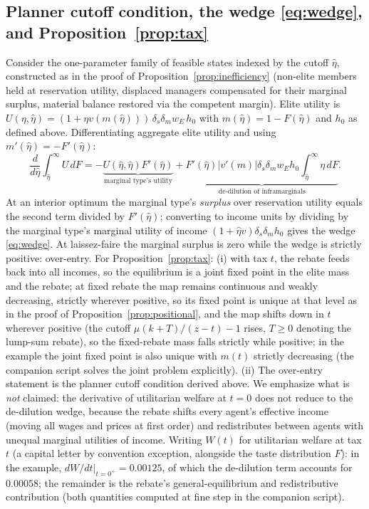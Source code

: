 \documentclass[12pt,letterpaper]{article}
\theoremstyle{definition}
\begin{document}
\subsection{Planner cutoff condition, the wedge \eqref{eq:wedge}, and Proposition~\ref{prop:tax}} Consider the one-parameter family of feasible states indexed by the cutoff $\hat\eta$, constructed as in the proof of Proposition~\ref{prop:inefficiency} (non-elite members held at reservation utility, displaced managers compensated for their marginal surplus, material balance restored via the competent margin).
Elite utility is $U(\eta,\hat\eta) = (1+\eta v(m(\hat\eta)))\,\delta_s\delta_m w_E\, h_0$ with $m(\hat\eta) = 1-F(\hat\eta)$ and $h_0$ as defined above.
Differentiating aggregate elite utility and using $m'(\hat\eta)=-F'(\hat\eta)$: \[ \frac{d}{d\hat\eta}\int_{\hat\eta}^{\infty}\!
U\, dF = -\underbrace{U(\hat\eta,\hat\eta)F'(\hat\eta)}_{\text{marginal type's utility}} + \underbrace{F'(\hat\eta)\left|v'(m)\right| \delta_s\delta_m w_E h_0 \int_{\hat\eta}^{\infty}\!\eta\, dF}_{\text{de-dilution of inframarginals}} .
\] At an interior optimum the marginal type's \emph{surplus} over reservation utility equals the second term divided by $F'(\hat\eta)$; converting to income units by dividing by the marginal type's marginal utility of income $(1+\hat\eta v)\delta_s\delta_m h_0$ gives the wedge \eqref{eq:wedge}.
At laissez-faire the marginal surplus is zero while the wedge is strictly positive: over-entry.
For Proposition~\ref{prop:tax}: (i) with tax $t$, the rebate feeds back into all incomes, so the equilibrium is a joint fixed point in the elite mass and the rebate; at fixed rebate the map remains continuous and weakly decreasing, strictly wherever positive, so its fixed point is unique at that level as in the proof of Proposition~\ref{prop:positional}, and the map shifts down in $t$ wherever positive (the cutoff $\mu(k+T)/(z-t)-1$ rises, $T\geq 0$ denoting the lump-sum rebate), so the fixed-rebate mass falls strictly while positive; in the example the joint fixed point is also unique with $m(t)$ strictly decreasing (the companion script solves the joint problem explicitly).
(ii) The over-entry statement is the planner cutoff condition derived above.
We emphasize what is \emph{not} claimed: the derivative of utilitarian welfare at $t=0$ does not reduce to the de-dilution wedge, because the rebate shifts every agent's effective income (moving all wages and prices at first order) and redistributes between agents with unequal marginal utilities of income.
Writing $W(t)$ for utilitarian welfare at tax $t$ (a capital letter by convention exception, alongside the taste distribution $F$): in the example, $dW/dt|_{t=0^+}=0.00125$, of which the de-dilution term accounts for $0.00058$; the remainder is the rebate's general-equilibrium and redistributive contribution (both quantities computed at fine step in the companion script).
\end{document}
